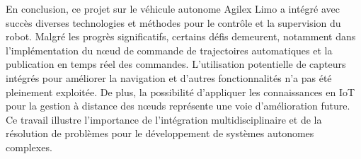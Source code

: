 En conclusion, ce projet sur le véhicule autonome Agilex Limo a intégré avec succès diverses technologies et méthodes pour le contrôle et la supervision du robot. Malgré les progrès significatifs, certains défis demeurent, notamment dans l'implémentation du nœud de commande de trajectoires automatiques et la publication en temps réel des commandes. L'utilisation potentielle de capteurs intégrés pour améliorer la navigation et d'autres fonctionnalités n'a pas été pleinement exploitée. De plus, la possibilité d'appliquer les connaissances en IoT pour la gestion à distance des nœuds représente une voie d'amélioration future. Ce travail illustre l'importance de l'intégration multidisciplinaire et de la résolution de problèmes pour le développement de systèmes autonomes complexes.